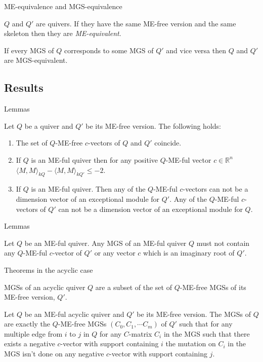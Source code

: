 \documentclass{beamer}
\begin{document}
\begin{frame}{ME-equivalence and MGS-equivalence}
\begin{definition}
$Q$ and $Q'$ are quivers. If they have the same ME-free version and the same skeleton then they are \textit{ME-equivalent}.\pause
\end{definition}
\begin{definition}
If every MGS of $Q$ corresponds to some MGS of $Q'$ and vice versa then $Q$ and $Q'$ are MGS-equivalent. 
\end{definition}
\end{frame}

\subsection{Results}

\begin{frame}{Lemmas}
\begin{lemma}
\indent Let $Q$ be a quiver and $Q'$ be its ME-free version. The following holds:\label{L2}
\begin{enumerate}
\item The set of $Q$-ME-free $c$-vectors of $Q$ and $Q'$ coincide.
\item If $Q$ is an ME-ful quiver then for any positive $Q$-ME-ful vector $c\in\mathbb{R}^n$ $\langle M,M\rangle_{kQ} - \langle M,M\rangle_{kQ'} \leq -2$.
\item If $Q$ is an ME-ful quiver. Then any of the $Q$-ME-ful $c$-vectors can not be a dimension vector of an exceptional module for $Q'$. Any of the $Q$-ME-ful $c$-vectors of $Q'$ can not be a dimension vector of an exceptional module for $Q$.
\end{enumerate}
\end{lemma}
\end{frame}

\begin{frame}{Lemmas}
\begin{lemma}
Let $Q$ be an ME-ful quiver. Any MGS of an ME-ful quiver $Q$ must not contain any $Q$-ME-ful $c$-vector of $Q'$ or any vector $c$ which is an imaginary root of $Q'$.
\end{lemma}
\end{frame}

\begin{frame}{Theorems in the acyclic case}
\begin{theorem}
MGSs of an acyclic quiver $Q$ are a subset of the set of $Q$-ME-free MGSs of its ME-free version, $Q'$.\label{T1B}
\end{theorem}
\begin{theorem}\label{T3B}
Let $Q$ be an ME-ful acyclic quiver and $Q'$ be its ME-free version. The MGSs of $Q$ are exactly the $Q$-ME-free MGSs $(C_0,C_1,\cdots C_m)$ of $Q'$ such that for any multiple edge from $i$ to $j$ in $Q$ for any $C$-matrix $C_i$ in the MGS such that there exists a negative $c$-vector with support containing $i$ the mutation on $C_i$ in the MGS isn't done on any negative $c$-vector with support containing $j$.
\end{theorem}
\end{frame}
\end{document}
